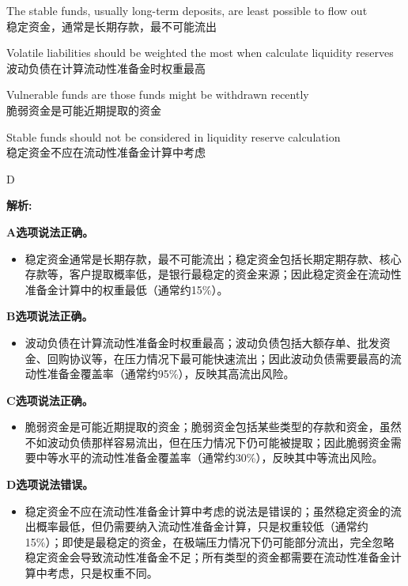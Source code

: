 \documentclass{article}
\newenvironment{explanation}
{\textbf{解析:}\par}
{\par}
\begin{document}
\begin{choices}
    \item The stable funds, usually long-term deposits, are least possible to flow out\\
    稳定资金，通常是长期存款，最不可能流出
    \item Volatile liabilities should be weighted the most when calculate liquidity reserves\\
    波动负债在计算流动性准备金时权重最高
    \item Vulnerable funds are those funds might be withdrawn recently\\
    脆弱资金是可能近期提取的资金
    \item Stable funds should not be considered in liquidity reserve calculation\\
    稳定资金不应在流动性准备金计算中考虑
\end{choices}

\begin{correctanswer}
    D
\end{correctanswer}

\begin{explanation}
    \textbf{A选项说法正确。}
    \begin{itemize}
        \item 稳定资金通常是长期存款，最不可能流出；稳定资金包括长期定期存款、核心存款等，客户提取概率低，是银行最稳定的资金来源；因此稳定资金在流动性准备金计算中的权重最低（通常约15\%）。
    \end{itemize}

    \textbf{B选项说法正确。}
    \begin{itemize}
        \item 波动负债在计算流动性准备金时权重最高；波动负债包括大额存单、批发资金、回购协议等，在压力情况下最可能快速流出；因此波动负债需要最高的流动性准备金覆盖率（通常约95\%），反映其高流出风险。
    \end{itemize}

    \textbf{C选项说法正确。}
    \begin{itemize}
        \item 脆弱资金是可能近期提取的资金；脆弱资金包括某些类型的存款和资金，虽然不如波动负债那样容易流出，但在压力情况下仍可能被提取；因此脆弱资金需要中等水平的流动性准备金覆盖率（通常约30\%），反映其中等流出风险。
    \end{itemize}

    \textbf{D选项说法错误。}
    \begin{itemize}
        \item 稳定资金不应在流动性准备金计算中考虑的说法是错误的；虽然稳定资金的流出概率最低，但仍需要纳入流动性准备金计算，只是权重较低（通常约15\%）；即使是最稳定的资金，在极端压力情况下仍可能部分流出，完全忽略稳定资金会导致流动性准备金不足；所有类型的资金都需要在流动性准备金计算中考虑，只是权重不同。
    \end{itemize}
\end{explanation}
\end{document}
